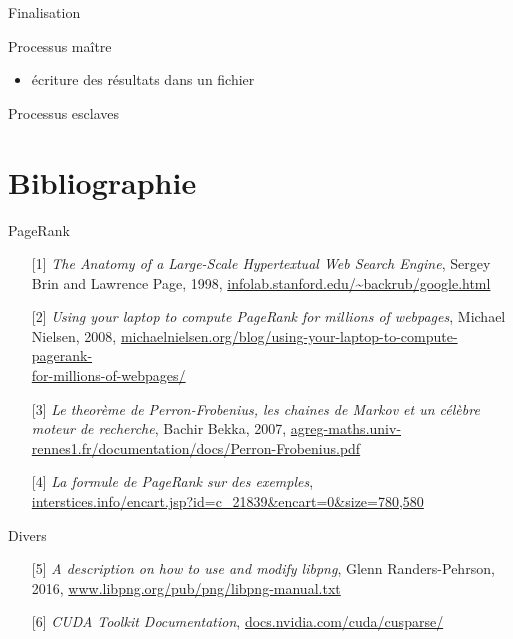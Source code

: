 \documentclass{beamer}
\begin{document}
  \begin{frame}{Finalisation}
    \begin{minipage}[c]{.45\linewidth}
      \begin{block}{Processus maître}
        \scriptsize{\begin{itemize}
          \item<1-> écriture des résultats dans un fichier
        \end{itemize}}
      \end{block}
    \end{minipage} \hfill
    \begin{minipage}[c]{.45\linewidth}
      \begin{block}{Processus esclaves}
        \vspace{0.5cm}
      \end{block}
    \end{minipage}
  \end{frame}
  
  \section{Bibliographie}
  
  \begin{frame}{PageRank}
    \begin{itemize}
      \item[{[1]}] \textit{The Anatomy of a Large-Scale Hypertextual Web Search Engine}, Sergey Brin and Lawrence Page, 1998, \url{infolab.stanford.edu/~backrub/google.html}
      \item[{[2]}] \textit{Using your laptop to compute PageRank for millions of webpages}, Michael Nielsen, 2008, \url{michaelnielsen.org/blog/using-your-laptop-to-compute-pagerank-}\\\url{for-millions-of-webpages/}
      \item[{[3]}] \textit{Le theorème de Perron-Frobenius, les chaines de Markov et un célèbre moteur de recherche}, Bachir Bekka, 2007, \url{agreg-maths.univ-rennes1.fr/documentation/docs/Perron-Frobenius.pdf}
      \item[{[4]}] \textit{La formule de PageRank sur des exemples}, \\\url{interstices.info/encart.jsp?id=c_21839&encart=0&size=780,580}
    \end{itemize}
  \end{frame}
  
  \begin{frame}{Divers}
    \begin{itemize}
      \item[{[5]}] \textit{A description on how to use and modify libpng}, Glenn Randers-Pehrson, 2016, \url{www.libpng.org/pub/png/libpng-manual.txt}
      \bigskip
      \item[{[6]}] \textit{CUDA Toolkit Documentation}, \url{docs.nvidia.com/cuda/cusparse/}
    \end{itemize}
  \end{frame}
  
\end{document}
